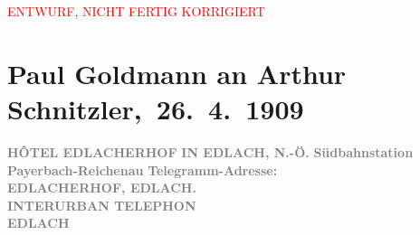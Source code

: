 
\begin{center}
            \textcolor{red}{ENTWURF, NICHT FERTIG KORRIGIERT}
                      \end{center}
            
         
         \renewcommand{\erwaehntePersonen}{Personen: Lili Cappellini, Paul Goldmann, Eva Marie Goldmann, Rudolf Lothar, Olga Schnitzler, Heinrich Schnitzler}
         \renewcommand{\erwaehnteInstitutionen}{Institutionen: k. k. Post- und Telegraphenverwaltung}
         \renewcommand{\erwaehnteOrte}{Orte: Bahnhof Payerbach-Reichenau, Berlin, Deutsches Theater Berlin, Edlach, Hotel Edlacherhof, Niederösterreich, Semmering, Wien}
         \renewcommand{\erwaehnteWerke}{Werke: Faust bei Reinhardt, Faust. Eine Tragödie, Pester Lloyd}
               \section[ Paul Goldmann an Arthur Schnitzler, 26. 4. 1909]{ Paul Goldmann an Arthur Schnitzler, 26. 4. 1909}\nopagebreak{}\rehead{ }\begin{ledgroupsized}[t]{13cm}\normalsize\beginnumbering \toendnotes[C]{\smallbreak\pagebreak[2]} 
\toendnotes[C]{\smallbreak}\pstart
           \noindent{}{\pb}\textcolor{gray}{\textbf{HÔTEL EDLACHERHOF}}\pend
           \pstart
           \raggedleft{}\textcolor{gray}{\textbf{IN EDLACH, N.-Ö.}}\pend
           \pstart
           \noindent{}\raggedleft{}\textcolor{gray}{\textbf{\textbf{Südbahnstation Payerbach-Reichenau}}}\pend
           \pstart
           \noindent{}\textcolor{gray}{\textbf{Telegramm-Adresse:}}{\\}\textcolor{gray}{\textbf{\textbf{EDLACHERHOF, EDLACH.}}}{\\}\textcolor{gray}{\textbf{INTERURBAN TELEPHON}}{\\}\textcolor{gray}{\textbf{\textbf{EDLACH
}}}
\end{ledgroupsized}
